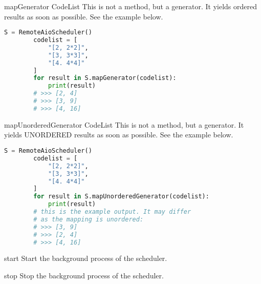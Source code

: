  {mapGenerator} {CodeList} {
	This is not a method, but a generator. It yields ordered results as soon as possible. See the example below.
}
\begin{lstlisting}[language=Python]
		S = RemoteAioScheduler()
		codelist = [
			"[2, 2*2]",
			"[3, 3*3]",
			"[4. 4*4]"
		]
		for result in S.mapGenerator(codelist):
			print(result)
		# >>> [2, 4]
		# >>> [3, 9]
		# >>> [4, 16]
\end{lstlisting}

 {mapUnorderedGenerator} {CodeList} {
	This is not a method, but a generator. It yields UNORDERED results as soon as possible. See the example below.
}
\begin{lstlisting}[language=Python]
		S = RemoteAioScheduler()
		codelist = [
			"[2, 2*2]",
			"[3, 3*3]",
			"[4. 4*4]"
		]
		for result in S.mapUnorderedGenerator(codelist):
			print(result)
		# this is the example output. It may differ
		# as the mapping is unordered:
		# >>> [3, 9]
		# >>> [2, 4]
		# >>> [4, 16]
\end{lstlisting}

 {start} {} {
	Start the background process of the scheduler.
}

 {stop} {} {
	Stop the background process of the scheduler.
}



